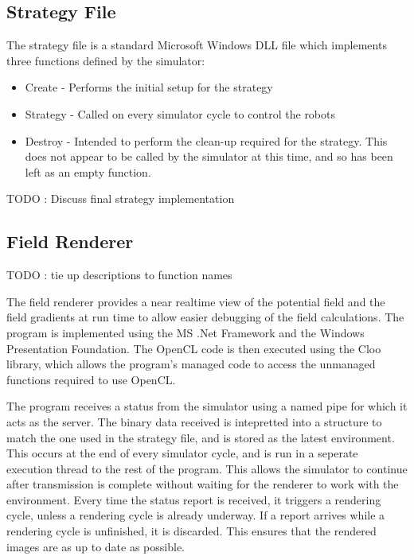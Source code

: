 \documentclass[10pt,british,english]{article}
\begin{document}
\subsection{Strategy File}

The strategy file is a standard Microsoft Windows \ac{DLL} file which implements three functions defined by the simulator:
\begin{itemize}
\item Create - Performs the initial setup for the strategy
\item Strategy - Called on every simulator cycle to control the robots
\item Destroy - Intended to perform the clean-up required for the strategy.
This does not appear to be called by the simulator at this time, and so has been left as an empty function.
\end{itemize}
TODO : Discuss final strategy implementation

\subsection{Field Renderer}

TODO : tie up descriptions to function names

The field renderer provides a near realtime view of the potential field and the field gradients at run time to allow easier debugging of the field calculations. The program is implemented using the MS .Net Framework and the Windows Presentation Foundation. The OpenCL code is then executed using the Cloo library, which allows the program's managed code to access the unmanaged functions required to use OpenCL.

The program receives a status from the simulator using a named pipe for which it acts as the server. The binary data received is intepretted into a structure to match the one used in the strategy file, and is stored as the latest environment. This occurs at the end of every simulator cycle, and is run in a seperate execution thread to the rest of the program. This allows the simulator to continue after transmission is complete without waiting for the renderer to work with the environment. Every time the status report is received, it triggers a rendering cycle, unless a rendering cycle is already underway. If a report arrives while a rendering cycle is unfinished, it is discarded. This ensures that the rendered images are as up to date as possible.
\end{document}
